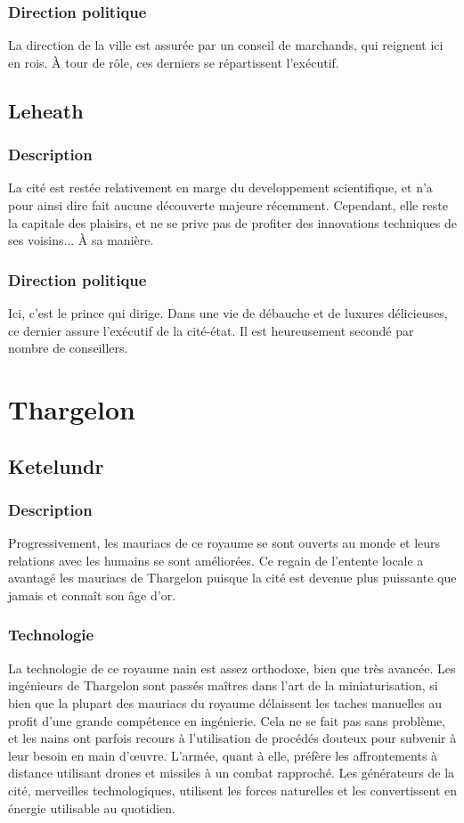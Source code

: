 \subsubsection{Direction politique}
La direction de la ville est assurée par un conseil de marchands, qui reignent ici en rois. À tour de rôle, ces derniers se répartissent l'exécutif.
\subsection{Leheath}
\subsubsection{Description}
La cité est restée relativement en marge du developpement scientifique, et n'a pour ainsi dire fait aucune découverte majeure récemment. Cependant, elle reste la capitale des plaisirs, et ne se prive pas de profiter des innovations techniques de ses voisins... À sa manière.
\subsubsection{Direction politique}
Ici, c'est le prince qui dirige. Dans une vie de débauche et de luxures délicieuses, ce dernier assure l'exécutif de la cité-état. Il est heureusement secondé par nombre de conseillers.
\section{Thargelon}
\subsection{Ketelundr}
\subsubsection{Description}
Progressivement, les mauriacs de ce royaume se sont ouverts au monde et leurs relations avec les humains se sont améliorées. Ce regain de l'entente locale a avantagé les mauriacs de Thargelon puisque la cité est devenue plus puissante que jamais et connaît son âge d'or.
\subsubsection{Technologie}
La technologie de ce royaume nain est assez orthodoxe, bien que très avancée. Les ingénieurs de Thargelon sont passés maîtres dans l'art de la miniaturisation, si bien que la plupart des mauriacs du royaume délaissent les taches manuelles au profit d'une grande compétence en ingénierie. Cela ne se fait pas sans problème, et les nains ont parfois recours à l'utilisation de procédés douteux pour subvenir à leur besoin en main d’œuvre. L'armée, quant à elle, préfère les affrontements à distance utilisant drones et missiles à un combat rapproché. Les générateurs de la cité, merveilles technologiques, utilisent les forces naturelles et les convertissent en énergie utilisable au quotidien.
